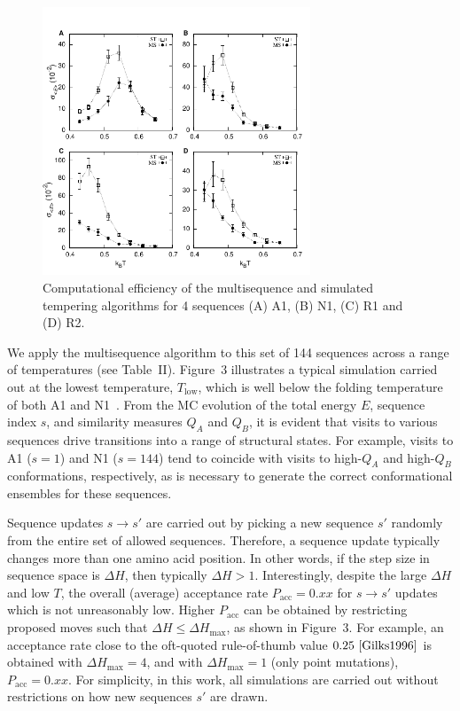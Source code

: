 \documentclass[%
 aip,
rsi,%
 amsmath,amssymb,
 reprint,%
]{revtex4-1}
\newcommand	 {\sbar}	{{s}}
\newcommand	 {\Tlow}	{{T_\mathrm{low}}}
\begin{document}
\begin{figure}
\includegraphics[width=8.0cm]{Stderr}
\caption{Computational efficiency of the multisequence and simulated tempering algorithms for 4 sequences (A) A1, (B) N1, (C) R1 and (D) R2.}
\end{figure}


We apply the multisequence algorithm to this set of 144 sequences across a range of temperatures (see Table~II). Figure~3 illustrates a typical simulation carried out at the lowest temperature, $\Tlow$, which is well below the folding temperature of both A1 and N1~\cite{Holzgrafe2014,Holzgrafe2015}. From the MC evolution of the total energy $E$, sequence index $\sbar$, and similarity measures $Q_A$ and $Q_B$, it is evident that visits to various sequences drive transitions into a range of structural states. For example, visits to A1 ($\sbar=1$) and N1 ($\sbar=144$) tend to coincide with visits to high-$Q_A$ and high-$Q_B$ conformations, respectively, as is necessary to generate the correct conformational ensembles for these sequences.

Sequence updates $\sbar\rightarrow\sbar'$ are carried out by picking a new sequence $\sbar'$ randomly from the entire set of allowed sequences. Therefore, a sequence update typically changes more than one amino acid position. In other words, if the step size in sequence space is $\Delta H$, then typically $\Delta H>1$. Interestingly, despite the large $\Delta H$ and low $T$, the overall (average) acceptance rate $P_\mathrm{acc}=0.xx$ for $\sbar\rightarrow\sbar'$ updates which is not unreasonably low. Higher $P_\mathrm{acc}$ can be obtained by restricting proposed moves such that $\Delta H\le\Delta H_\mathrm{max}$, as shown in Figure~3. For example, an acceptance rate close to the oft-quoted rule-of-thumb value $0.25~\cite{Gilks1996} $ is obtained with $\Delta H_\mathrm{max}=4$, and with $\Delta H_\mathrm{max} = 1$ (only point mutations), $P_\mathrm{acc}=0.xx$. For simplicity, in this work, all simulations are carried out without restrictions on how new sequences $\sbar'$ are drawn. 
\end{document}
